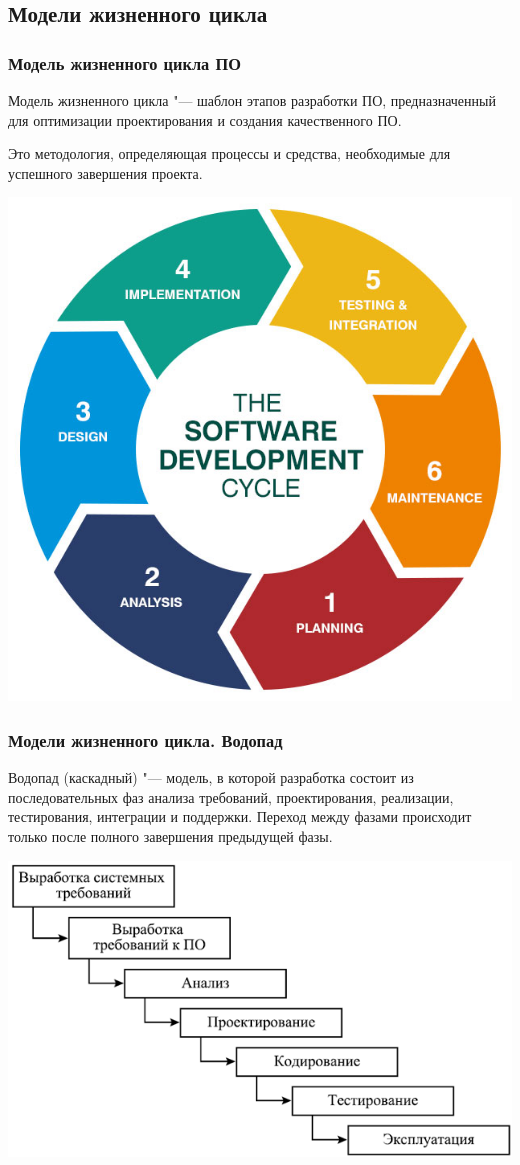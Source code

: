 \documentclass{../industrial-development}
\begin{document}
\subsection{Модели жизненного цикла}


\begin{frame} \frametitle{Модель жизненного цикла ПО}
	\alert{Модель жизненного цикла} "--- шаблон этапов разработки ПО, предназначенный для оптимизации проектирования и создания качественного ПО.
	
	Это методология, определяющая процессы и средства, необходимые для успешного завершения проекта.
	
	\centerline{\includegraphics[height=0.50\textheight]{image14.png}}
\end{frame}
\lecturenotes


\begin{frame} \frametitle{Модели жизненного цикла. Водопад}
	\alert{Водопад (каскадный)} "--- модель, в которой разработка состоит из последовательных фаз анализа требований, проектирования, реализации, тестирования, интеграции и поддержки. Переход между фазами происходит только после полного завершения предыдущей фазы.
	
	\centerline{\includegraphics[height=0.50\textheight]{image16.png}}
\end{frame}
\lecturenotes
\end{document}
